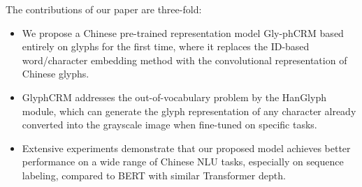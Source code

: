 The contributions of our paper are three-fold:
\begin{itemize}
    \item We propose a Chinese pre-trained representation model Gly-phCRM based entirely on glyphs for the first time, where it replaces the ID-based word/character embedding method with the convolutional representation of Chinese glyphs. 
    \item GlyphCRM addresses the out-of-vocabulary problem by the HanGlyph module, which can generate the glyph representation of any character already converted into the grayscale image when fine-tuned on specific tasks.
    \item Extensive experiments demonstrate that our proposed model achieves better performance on a wide range of Chinese NLU tasks, especially on sequence labeling, compared to BERT with similar Transformer depth.
\end{itemize}

